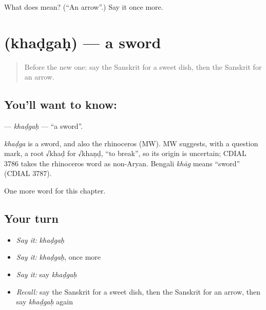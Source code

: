 \begin{tcolorbox}[breakable,colback=teal!4,colframe=teal!35!black,title={Before you move on}]
What does  mean? (\textquotedblleft{}An arrow\textquotedblright{}.) Say it once more.
\end{tcolorbox}
\section[\texorpdfstring{\sk{खड्गः} (khaḍgaḥ)}{खड्गः (khaḍgaḥ)}]{ (khaḍgaḥ) — a sword}

\label{lesson:SA-C247-khadgah}



\begin{quote}
Before the new one: say the Sanskrit for a sweet dish, then the Sanskrit for an arrow.
\end{quote}

\subsection*{You'll want to know: }
\textbf{} — \emph{khaḍgaḥ} — \textquotedblleft{}a sword\textquotedblright{}.

\begin{cousinweb}
\emph{khaḍga} is a sword, and also the rhinoceros (MW). MW suggests, with a question mark, a root √khaḍ for √khaṇḍ, \textquotedblleft{}to break\textquotedblright{}, so its origin is uncertain; CDIAL 3786 takes the rhinoceros word as non-Aryan. Bengali \emph{khāg} means \textquotedblleft{}sword\textquotedblright{} (CDIAL 3787).
\end{cousinweb}

\begin{grammarlens}[title={What you've built}]
One more word for this chapter.
\end{grammarlens}

\subsection*{Your turn}
\begin{itemize}
\raggedright
  \item \emph{Say it:} \emph{khaḍgaḥ}
  \item \emph{Say it:} \emph{khaḍgaḥ}, once more
  \item \emph{Say it:} say \emph{khaḍgaḥ}
  \item \emph{Recall:} say the Sanskrit for a sweet dish, then the Sanskrit for an arrow, then say \emph{khaḍgaḥ} again
\end{itemize}

